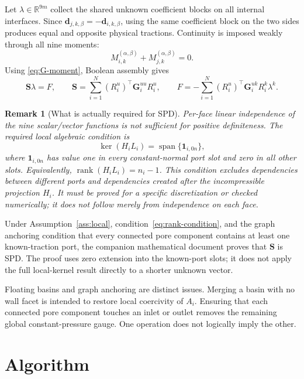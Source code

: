 \documentclass[11pt,a4paper]{article}
\newtheorem{remark}{Remark}
\newcommand{\R}{\mathbb{R}}
\newcommand{\DtN}{\mathbf{G}}
\newcommand{\Schur}{\mathbf{S}}
\begin{document}
Let $\lambda\in\R^{9m}$ collect the shared unknown coefficient blocks on all
internal interfaces.  Since $\bm d_{j,k,\beta}=-\bm d_{i,k,\beta}$, using the
same coefficient block on the two sides produces equal and opposite physical
tractions.  Continuity is imposed weakly through all nine moments:
\begin{equation}\label{eq:moment-continuity}
 M_{i,k}^{(\alpha,\beta)}+M_{j,k}^{(\alpha,\beta)}=0.
\end{equation}
Using \eqref{eq:G-moment}, Boolean assembly gives
\begin{equation}\label{eq:schur}
 \Schur\lambda=F,\qquad
 \Schur=\sum_{i=1}^N(R_i^u)^\top\DtN_i^{uu}R_i^u,
 \qquad
 F=-\sum_{i=1}^N(R_i^u)^\top\DtN_i^{uk}R_i^k\lambda^k.
\end{equation}

\begin{remark}[What is actually required for SPD]\label{rem:spd}
Per-face linear independence of the nine scalar/vector functions is not
sufficient for positive definiteness.  The required local algebraic condition
is
\begin{equation}\label{eq:rank-condition}
 \ker(H_iL_i)=\operatorname{span}\{\bm 1_{i,0n}\},
\end{equation}
where $\bm 1_{i,0n}$ has value one in every constant-normal port slot and
zero in all other slots.  Equivalently,
$\operatorname{rank}(H_iL_i)=n_i-1$.  This condition excludes dependencies
between different ports and dependencies created after the incompressible
projection $H_i$.  It must be proved for a specific discretization or checked
numerically; it does not follow merely from independence on each face.
\end{remark}

Under Assumption~\ref{ass:local}, condition~\eqref{eq:rank-condition}, and the
graph anchoring condition that every connected pore component contains at
least one known-traction port, the companion mathematical document proves
that $\Schur$ is SPD.  The proof uses zero extension into the known-port slots;
it does not apply the full local-kernel result directly to a shorter unknown
vector.

Floating basins and graph anchoring are distinct issues.  Merging a basin with
no wall facet is intended to restore local coercivity of $A_i$.  Ensuring that
each connected pore component touches an inlet or outlet removes the remaining
global constant-pressure gauge.  One operation does not logically imply the
other.

\section{Algorithm}
\end{document}

